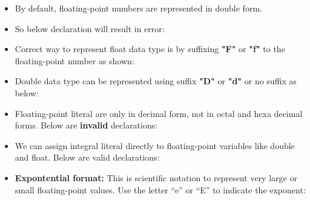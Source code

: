 
\begin{flushleft}

	\begin{itemize}
		
		\item By default, floating-point numbers are represented in double form.
		\item So below declaration will result in error: 
		\bigskip		
		\bigskip		
		
		\item Correct way to represent float data type is by suffixing \textbf{"F"} or \textbf{"f"} to the floating-point number as shown:
		\bigskip

		\item Double data type can be represented using suffix \textbf{"D"} or \textbf{"d"} or no suffix as below:
		\bigskip
	
		\item Floating-point literal are only in decimal form, not in octal and hexa decimal forms. Below are \textbf{invalid} declarations:
		\bigskip
		\newpage
		\item We can assign integral literal directly to floating-point variables like double and float. Below are valid declarations:
		\bigskip
			
		\item \textbf{Expontential format:} This is scientific notation to represent very large or small floating-point values. Use the letter “e” or “E” to indicate the exponent:
				\bigskip
		

\end{itemize}
\end{flushleft}
